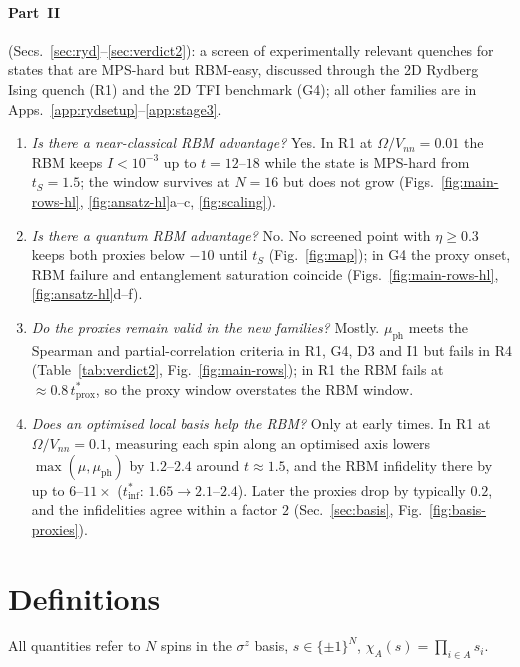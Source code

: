 \documentclass[11pt,a4paper]{article}
\newcommand{\inff}{I}
\newcommand{\tinf}{t^*_{\mathrm{inf}}}
\newcommand{\tprox}{t^*_{\mathrm{prox}}}
\begin{document}
\paragraph{Part~II} (Secs.~\ref{sec:ryd}--\ref{sec:verdict2}): a screen of experimentally relevant quenches for
states that are MPS-hard but RBM-easy, discussed through the 2D Rydberg Ising quench (R1) and the 2D TFI benchmark
(G4); all other families are in Apps.~\ref{app:rydsetup}--\ref{app:stage3}.
\begin{enumerate}[resume]
  \item \emph{Is there a near-classical RBM advantage?}
    Yes. In R1 at $\Omega/V_{nn}=0.01$ the RBM keeps $\inff<10^{-3}$ up to $t=12$--$18$ while the state is MPS-hard
    from $t_S=1.5$; the window survives at $N=16$ but does not grow (Figs.~\ref{fig:main-rows-hl},
    \ref{fig:ansatz-hl}a--c, \ref{fig:scaling}).
  \item \emph{Is there a quantum RBM advantage?}
    No. No screened point with $\eta\ge0.3$ keeps both proxies below $-10$ until $t_S$ (Fig.~\ref{fig:map}); in G4
    the proxy onset, RBM failure and entanglement saturation coincide (Figs.~\ref{fig:main-rows-hl},
    \ref{fig:ansatz-hl}d--f).
  \item \emph{Do the proxies remain valid in the new families?}
    Mostly. $\mu_{\mathrm{ph}}$ meets the Spearman and partial-correlation criteria in R1, G4, D3 and I1 but fails in
    R4 (Table~\ref{tab:verdict2}, Fig.~\ref{fig:main-rows}); in R1 the RBM fails at $\approx0.8\,\tprox$, so the
    proxy window overstates the RBM window.
  \item \emph{Does an optimised local basis help the RBM?}
    Only at early times. In R1 at $\Omega/V_{nn}=0.1$, measuring each spin along an optimised axis lowers
    $\max(\mu,\mu_{\mathrm{ph}})$ by $1.2$--$2.4$ around $t\approx1.5$, and the RBM infidelity there by up to
    $6$--$11\times$ ($\tinf$: $1.65\to2.1$--$2.4$). Later the proxies drop by typically $0.2$, and the infidelities agree
    within a factor $2$ (Sec.~\ref{sec:basis}, Fig.~\ref{fig:basis-proxies}).
\end{enumerate}

\section{Definitions}
\label{sec:defs}
All quantities refer to $N$ spins in the $\sigma^z$ basis, $s\in\{\pm1\}^N$, $\chi_A(s)=\prod_{i\in A}s_i$.
\end{document}
